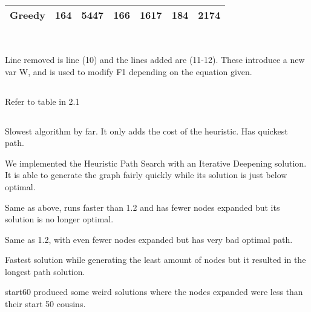 \documentclass[12pt]{article}
\begin{document}
\begin{table}[h]
\begin{tabular}{|l|l|l|l|l|l|l|}
Greedy                                                  & 164                                                   & 5447                                                            & 166                                                   & 1617                                                          & 184                                                   & 2174                                                              \\ \hline
\end{tabular}
\end{table}

\subsection{}

\\
Line removed is line (10) and the lines added are (11-12). These introduce a new var W, and is used to modify F1 depending on the equation given.\\

\subsection{}
Refer to table in 2.1

\subsection{}
\begin{description}[font=$\bullet$\scshape\bfseries]
  \item [IDA*] Slowest algorithm by far. It only adds the cost of the heuristic. Has quickest path.
  \item [1.2] We implemented the Heuristic Path Search with an Iterative Deepening solution. It is able to generate the graph fairly quickly while its solution is just below optimal.
  \item [1.4] Same as above, runs faster than 1.2 and has fewer nodes expanded but its solution is no longer optimal.
  \item [1.6] Same as 1.2, with even fewer nodes expanded but has very bad optimal path.
  \item [Greedy] Fastest solution while generating the least amount of nodes but it resulted in the longest path solution.
  \item [Outlier] start60 produced some weird solutions where the nodes expanded were less than their start 50 cousins.
\end{description}
\end{document}
